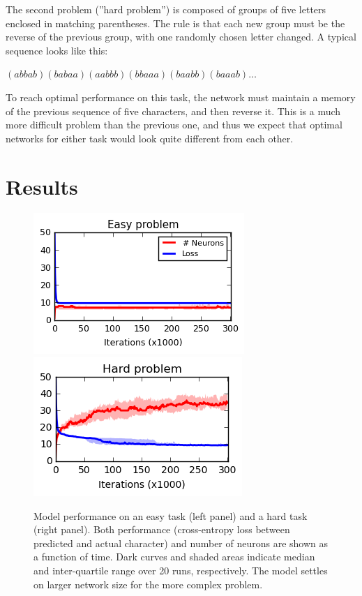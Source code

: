 \documentclass{article}
\begin{document}
The second problem (''hard problem'') is composed of groups of five letters
enclosed in matching parentheses. The rule is that each new group must be the
reverse of the previous group, with one randomly chosen letter changed. A
typical sequence looks like this:

\begin{center}
$(abbab)(babaa)(aabbb)(bbaaa)(baabb)(baaab) \ldots$
\end{center}

To reach optimal performance on this task, the network must maintain a memory
of the previous sequence of five characters, and then reverse it. This is a
much more difficult problem than the previous one, and thus we expect that
optimal networks for either task would look quite different from each other.

\section{Results}

\begin{figure}[ht]
\label{fig:easyandhard}
  \centering
\includegraphics[scale=0.9]{figE.png}
\includegraphics[scale=0.9]{figH.png}
  \caption{Model performance on an easy task (left panel) and a hard task
(right panel). Both performance (cross-entropy loss between predicted and
actual character) and number of neurons are shown as a function of time. Dark curves and shaded areas indicate median and inter-quartile range over 20 runs, respectively. The
model settles on larger network size for the more complex problem. }
\end{figure}
\end{document}
